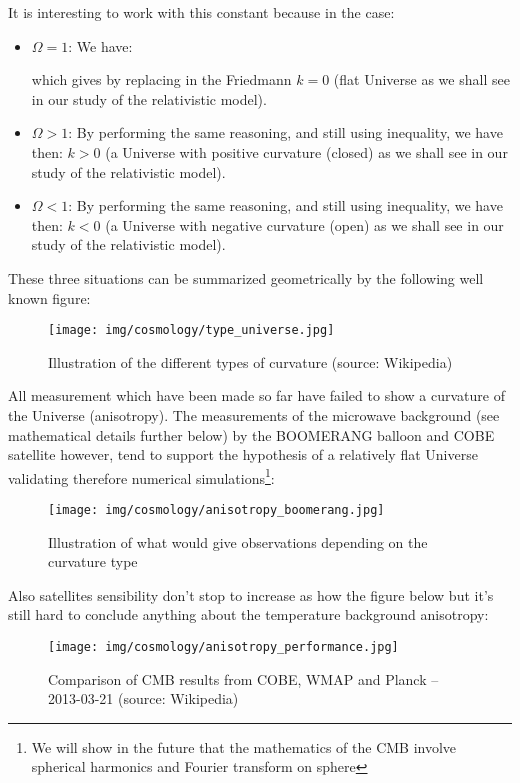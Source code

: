 	It is interesting to work with this constant because in the case:
	\begin{itemize}
		\item $\Omega=1$:
		We have:
		
		which gives by replacing in the Friedmann $k=0$ (flat Universe as we shall see in our study of the relativistic model).

		\item $\Omega>1$:
		By performing the same reasoning, and still using inequality, we have then: $k>0$ (a Universe with positive curvature (closed) as we shall see in our study of the relativistic model).

		\item $\Omega<1$:
		By performing the same reasoning, and still using inequality, we have then: $k<0$ (a Universe with negative curvature (open) as we shall see in our study of the relativistic model).
	\end{itemize}
	These three situations can be summarized geometrically by the following well known figure:
	\begin{figure}[H]
		\begin{center}
		\texttt{[image: img/cosmology/type\_universe.jpg]}
		\end{center}	
		\caption[Illustration of the different types of curvature]{Illustration of the different types of curvature (source: Wikipedia)}
	\end{figure}
	All measurement which have been made so far have failed to show a curvature of the Universe (anisotropy). The measurements of the microwave background (see mathematical details further below) by the BOOMERANG balloon and COBE satellite however, tend to support the hypothesis of a relatively flat Universe validating therefore numerical simulations\footnote{We will show in the future that the mathematics of the CMB involve spherical harmonics and Fourier transform on sphere}:
	\begin{figure}[H]
		\begin{center}
		\texttt{[image: img/cosmology/anisotropy\_boomerang.jpg]}
		\end{center}	
		\caption{Illustration of what would give observations depending on the curvature type}
	\end{figure}
	Also satellites sensibility don't stop to increase as how the figure below but it's still hard to conclude anything about the temperature background anisotropy:
	\begin{figure}[H]
		\begin{center}
		\texttt{[image: img/cosmology/anisotropy\_performance.jpg]}
		\end{center}	
		\caption[Comparison of CMB results from COBE, WMAP and Planck]{Comparison of CMB results from COBE, WMAP and Planck – 2013-03-21 (source: Wikipedia)}
	\end{figure}
